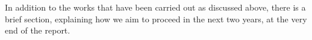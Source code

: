 In addition to the works that have been carried out as discussed above, there is a brief section, explaining how we aim to proceed in the next two years, at the very end of the report.


\makeatletter
\edef\fontandleading{\@memptsize.0/\the\baselineskip}
\makeatother









